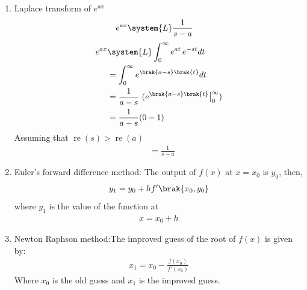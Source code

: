 \begin{enumerate}[label=\thesubsection.\arabic*,ref=\thesubsection.\theenumi]
\item
Laplace transform of $e^{ax}$
\begin{align}
	e^{ax}&\system{L}\frac{1}{s-a}\label{eq:laplacee^ax}
\end{align}
\solution
\begin{align}	
    e^{ax}&\system{L}\int_{0}^{\infty}e^{at}\,e^{-st} dt\\
                      &=\int_{0}^{\infty}e^{\brak{a-s}\brak{t}} dt\\
                      &=\frac{1}{a-s}\,\,(e^{\brak{a-s}\brak{t}}\big|_{0}^{\infty})\\
                      &=\frac{1}{a-s}(0-1)
                      \end{align}
                      Assuming that $\operatorname{re}(s)>\operatorname{re}(a)$
                      \begin{align}
                      &=\frac{1}{s-a}
\end{align}

\item

Euler's forward difference method: The output of $f(x)$ at $x=x_0$ is $y_0$, then,
\begin{align}
y_1=y_0+hf'\brak{x_0,y_0}\label{eq:fwdeuler}
\end{align}
where $y_1$ is the value of the function at 
\begin{align}
x=x_0+h
\end{align}

\item 
Newton Raphson method:The improved guess of the root of $f(x)$ is given by:
\begin{align}
x_1=x_0-\frac{f(x_0)}{f'(x_0)}\label{eq:raph}
\end{align} 
Where $x_0$ is the old guess and $x_1$ is the improved guess.







\end{enumerate}


